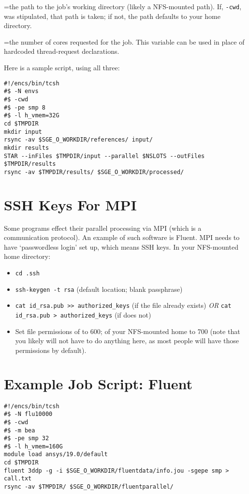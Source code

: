 \documentclass{easychair}
\begin{document}
=the path to the job's working directory (likely a NFS-mounted  path). If, \texttt{-cwd}, was stipulated, that path is taken; if not, the path defaults to your home  directory.  

=the number of cores requested for the job. This variable can be used in  place of hardcoded thread-request declarations. 

Here is a sample script, using all three: 

\begin{verbatim}
#!/encs/bin/tcsh 
#$ -N envs 
#$ -cwd 
#$ -pe smp 8 
#$ -l h_vmem=32G 
cd $TMPDIR 
mkdir input 
rsync -av $SGE_O_WORKDIR/references/ input/ 
mkdir results
STAR --inFiles $TMPDIR/input --parallel $NSLOTS --outFiles $TMPDIR/results 
rsync -av $TMPDIR/results/ $SGE_O_WORKDIR/processed/ 
\end{verbatim}

\section{SSH Keys For MPI}

Some programs effect their parallel processing via MPI (which is a communication protocol). An example of such software is Fluent. MPI needs to have `passwordless login' set up, which means SSH keys. In your NFS-mounted home directory:

\begin{itemize}
\item
\texttt{cd .ssh}
\item
\texttt{ssh-keygen -t rsa} (default location; blank passphrase) 
\item
\texttt{cat id\_rsa.pub >> authorized\_keys} (if the  file already exists) \emph{OR} \texttt{cat id\_rsa.pub > authorized\_keys} (if does not) 
\item
Set file permissions of  to 600; of your NFS-mounted home to 700 (note that you likely will not have to do anything here, as most people will have those permissions by default). 
\end{itemize}

\section{Example Job Script: Fluent}

\begin{verbatim}
#!/encs/bin/tcsh 
#$ -N flu10000 
#$ -cwd 
#$ -m bea 
#$ -pe smp 32 
#$ -l h_vmem=160G 
module load ansys/19.0/default
cd $TMPDIR 
fluent 3ddp -g -i $SGE_O_WORKDIR/fluentdata/info.jou -sgepe smp > call.txt 
rsync -av $TMPDIR/ $SGE_O_WORKDIR/fluentparallel/ 
\end{verbatim}
\end{document}
